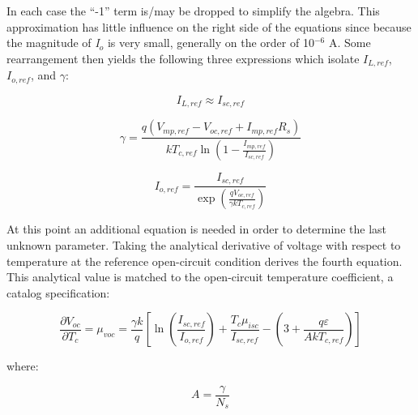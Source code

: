 In each case the ``-1'' term is/may be dropped to simplify the algebra. This approximation has little influence on the right side of the equations since because the magnitude of \emph{I\(_{o}\)} is very small, generally on the order of 10\(^{-6}\) A. Some rearrangement then yields the following three expressions which isolate \(I_{L,ref}\), \(I_{o,ref}\), and \(\gamma\):

\begin{equation}
{I_{L,ref}} \approx {I_{sc,ref}}
\label{eq:ElecLoadILref875}
\end{equation}

\begin{equation}
\gamma  = \frac{{q\left( {{V_{mp,ref}} - {V_{oc,ref}} + I_{mp,ref}^{}{R_s}} \right)}}{{k{T_{c,ref}}\ln \left( {1 - \frac{{{I_{mp,ref}}}}{{{I_{sc,ref}}}}} \right)}}
\label{eq:ElecLoadGamma876}
\end{equation}

\begin{equation}
{I_{o,ref}} = \frac{{{I_{sc,ref}}}}{{\exp \left( {\frac{{q{V_{oc,ref}}}}{{\gamma k{T_{c,ref}}}}} \right)}}
\label{eq:ElecLoadIoref877}
\end{equation}

At this point an additional equation is needed in order to determine the last unknown parameter. Taking the analytical derivative of voltage with respect to temperature at the reference open-circuit condition derives the fourth equation. This analytical value is matched to the open-circuit temperature coefficient, a catalog specification:

\begin{equation}
\frac{{\partial {V_{oc}}}}{{\partial {T_c}}} = {\mu_{voc}} = \frac{{\gamma k}}{q}\left[ {\ln \left( {\frac{{{I_{sc,ref}}}}{{{I_{o,ref}}}}} \right) + \frac{{{T_c}\mu_{isc}^{}}}{{{I_{sc,ref}}}} - \left( {3 + \frac{{q\varepsilon }}{{Ak{T_{c,ref}}}}} \right)} \right]
\label{eq:ElecLoaddVocdTc878}
\end{equation}

where:

\begin{equation}
A = \frac{\gamma }{{{N_s}}}
\end{equation}

